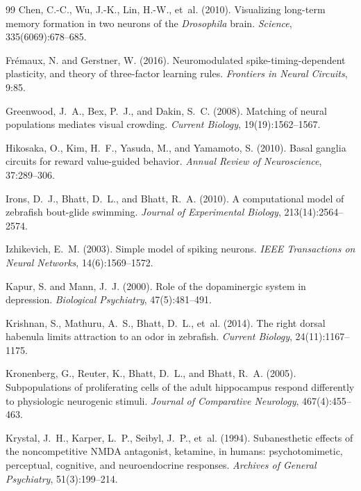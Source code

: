 \documentclass[12pt]{article}
\begin{document}
\begin{thebibliography}{99}
Chen, C.-C., Wu, J.-K., Lin, H.-W., et~al. (2010).
Visualizing long-term memory formation in two neurons of the \textit{Drosophila} brain.
\textit{Science}, 335(6069):678--685.

Fr{\'e}maux, N. and Gerstner, W. (2016).
Neuromodulated spike-timing-dependent plasticity, and theory of three-factor learning rules.
\textit{Frontiers in Neural Circuits}, 9:85.

Greenwood, J.~A., Bex, P.~J., and Dakin, S.~C. (2008).
Matching of neural populations mediates visual crowding.
\textit{Current Biology}, 19(19):1562--1567.

Hikosaka, O., Kim, H.~F., Yasuda, M., and Yamamoto, S. (2010).
Basal ganglia circuits for reward value-guided behavior.
\textit{Annual Review of Neuroscience}, 37:289--306.

Irons, D.~J., Bhatt, D.~L., and Bhatt, R.~A. (2010).
A computational model of zebrafish bout-glide swimming.
\textit{Journal of Experimental Biology}, 213(14):2564--2574.

Izhikevich, E.~M. (2003).
Simple model of spiking neurons.
\textit{IEEE Transactions on Neural Networks}, 14(6):1569--1572.

Kapur, S. and Mann, J.~J. (2000).
Role of the dopaminergic system in depression.
\textit{Biological Psychiatry}, 47(5):481--491.

Krishnan, S., Mathuru, A.~S., Bhatt, D.~L., et~al. (2014).
The right dorsal habenula limits attraction to an odor in zebrafish.
\textit{Current Biology}, 24(11):1167--1175.

Kronenberg, G., Reuter, K., Bhatt, D.~L., and Bhatt, R.~A. (2005).
Subpopulations of proliferating cells of the adult hippocampus respond differently to physiologic neurogenic stimuli.
\textit{Journal of Comparative Neurology}, 467(4):455--463.

Krystal, J.~H., Karper, L.~P., Seibyl, J.~P., et~al. (1994).
Subanesthetic effects of the noncompetitive NMDA antagonist, ketamine, in humans: psychotomimetic, perceptual, cognitive, and neuroendocrine responses.
\textit{Archives of General Psychiatry}, 51(3):199--214.


\end{thebibliography}
\end{document}
